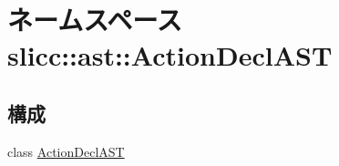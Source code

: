 \hypertarget{namespaceslicc_1_1ast_1_1ActionDeclAST}{
\section{ネームスペース slicc::ast::ActionDeclAST}
\label{namespaceslicc_1_1ast_1_1ActionDeclAST}
}
\subsection*{構成}
\begin{DoxyCompactItemize}
\item 
class \hyperlink{classslicc_1_1ast_1_1ActionDeclAST_1_1ActionDeclAST}{ActionDeclAST}
\end{DoxyCompactItemize}
